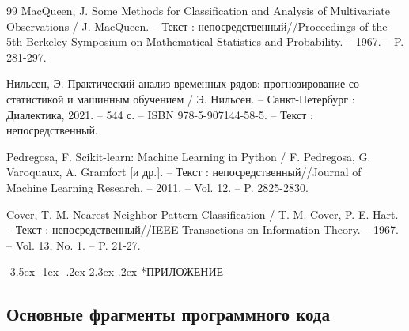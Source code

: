 \documentclass[14pt, a4paper]{extarticle}
\makeatletter
\renewcommand\section{\@startsection {section}{1}{\z@}%
                                   {-3.5ex \@plus -1ex \@minus -.2ex}%
                                   {2.3ex \@plus.2ex}%
                                   {\centering\normalfont\Large\bfseries}}
\makeatother
\begin{document}
\begin{thebibliography}{99}
MacQueen, J. Some Methods for Classification and Analysis of Multivariate Observations / J. MacQueen. – Текст : непосредственный//Proceedings of the 5th Berkeley Symposium on Mathematical Statistics and Probability. – 1967. – P. 281-297.

Нильсен, Э. Практический анализ временных рядов: прогнозирование со статистикой и машинным обучением / Э. Нильсен. – Санкт-Петербург : Диалектика, 2021. – 544 с. – ISBN 978-5-907144-58-5. – Текст : непосредственный.

Pedregosa, F. Scikit-learn: Machine Learning in Python / F. Pedregosa, G. Varoquaux, A. Gramfort [и др.]. – Текст : непосредственный//Journal of Machine Learning Research. – 2011. – Vol. 12. – P. 2825-2830.

Cover, T. M. Nearest Neighbor Pattern Classification / T. M. Cover, P. E. Hart. – Текст : непосредственный//IEEE Transactions on Information Theory. – 1967. – Vol. 13, No. 1. – P. 21-27.

\end{thebibliography}

\newpage
\section*{ПРИЛОЖЕНИЕ}

\subsection*{Основные фрагменты программного кода}
\end{document}
